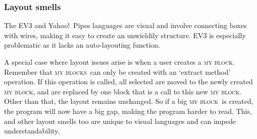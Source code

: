 \documentclass[conference]{IEEEtran}
\newcommand{\mbs}{\textsc{my blocks}}
\newcommand{\mb}{\textsc{my block}}
\newcommand{\todo}[1]{\textbf{#1}}
\begin{document}
\subsubsection{Layout smells}
The EV3 and Yahoo!\ Pipes languages are visual and involve connecting boxes with wires, making it easy to create an unwieldily structure. EV3 is especially problematic as it lacks an auto-layouting function.

A special case where layout issues arise is when a user creates a \mb. Remember that \mbs~can only be created with an `extract method' operation. If this operation is called, all selected are moved to the newly created \mb, and are replaced by one block that is a call to this new \mb. Other than that, the layout remains unchanged. So if a big \mb~is created, the program will now have a big gap, making the program harder to read. This, and other layout smells too are unique to visual languages and can impede understandability. 

%
%	


\end{document}
